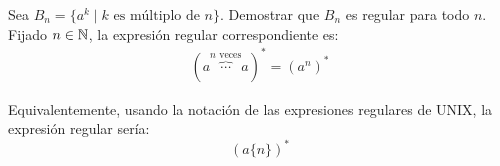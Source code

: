 \begin{ejercicio}
    Sea $B_n = \{a^k \mid k \text{\ es múltiplo de\ } n\}$. Demostrar que $B_n$ es regular para todo $n$.\\

    Fijado $n\in \mathbb{N}$, la expresión regular correspondiente es:
    \begin{align*}
        (a\overbrace{\cdots }^{n \text{\ veces}}a)^* = (a^n)^*
    \end{align*}

    Equivalentemente, usando la notación de las expresiones regulares de UNIX, la expresión regular sería:
    \begin{equation*}
        (a\{n\})^*
    \end{equation*}
\end{ejercicio}

